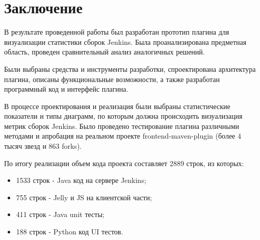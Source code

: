 \chapter*{Заключение} \label{ch-conclusion}

В результате проведенной работы был разработан прототип плагина для визуализации статистики сборок Jenkins. Была проанализирована предметная область, проведен сравнительный анализ аналогичных решений.

Были выбраны средства и инструменты разработки, спроектирована архитектура плагина, описаны функциональные возможности, а также разработан программный код и интерфейс плагина.

В процессе проектирования и реализация были выбраны статистические показатели и типы диаграмм, по которым должна происходить визуализация метрик сборок Jenkins. Было проведено тестирование плагина различными методами и апробация на реальном проекте frontend-maven-plugin (более 4 тысяч звезд и 863 forks).

По итогу реализации объем кода проекта составляет 2889 строк, из которых:

\begin{itemize}
	\item 1533 строк  - Java код на сервере Jenkins;
	\item 755 строк - Jelly и JS на клиентской части;
	\item 411 строк - Java unit тесты;
	\item 188 строк - Python код UI тестов.
\end{itemize}
